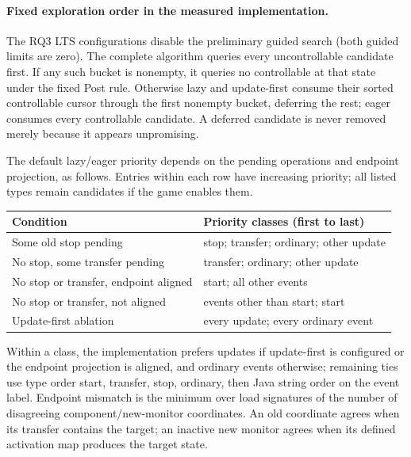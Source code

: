 \documentclass[11pt]{article}
\begin{document}
\paragraph{Fixed exploration order in the measured implementation.}
\label{supp:ordering}
The RQ3 LTS configurations disable the preliminary guided search (both guided limits are zero). The complete algorithm queries every uncontrollable candidate first. If any such bucket is nonempty, it queries no controllable at that state under the fixed Post rule. Otherwise lazy and update-first consume their sorted controllable cursor through the first nonempty bucket, deferring the rest; eager consumes every controllable candidate. A deferred candidate is never removed merely because it appears unpromising.

The default lazy/eager priority depends on the pending operations and endpoint projection, as follows. Entries within each row have increasing priority; all listed types remain candidates if the game enables them.
\begin{center}\small
\begin{tabular}{@{}p{.40\linewidth}p{.56\linewidth}@{}}\toprule
Condition & Priority classes (first to last)\\\midrule
Some old stop pending & stop; transfer; ordinary; other update\\
No stop, some transfer pending & transfer; ordinary; other update\\
No stop or transfer, endpoint aligned & start; all other events\\
No stop or transfer, not aligned & events other than start; start\\
Update-first ablation & every update; every ordinary event\\\bottomrule
\end{tabular}
\end{center}
Within a class, the implementation prefers updates if update-first is configured or the endpoint projection is aligned, and ordinary events otherwise; remaining ties use type order start, transfer, stop, ordinary, then Java string order on the event label. Endpoint mismatch is the minimum over load signatures of the number of disagreeing component/new-monitor coordinates. An old coordinate agrees when its transfer contains the target; an inactive new monitor agrees when its defined activation map produces the target state.
\end{document}
